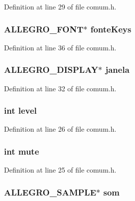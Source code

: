 Definition at line 29 of file comum.\-h.

\hypertarget{struct_game_a33606e6edba2c6b798d0c70df15eb89f}{
\subsubsection[{fonte\-Keys}]{\setlength{\rightskip}{0pt plus 5cm}A\-L\-L\-E\-G\-R\-O\-\_\-\-F\-O\-N\-T$\ast$ fonte\-Keys}}\label{struct_game_a33606e6edba2c6b798d0c70df15eb89f}


Definition at line 36 of file comum.\-h.

\hypertarget{struct_game_ab05780cb7c970d487cfa4eaeb3b583d2}{
\subsubsection[{janela}]{\setlength{\rightskip}{0pt plus 5cm}A\-L\-L\-E\-G\-R\-O\-\_\-\-D\-I\-S\-P\-L\-A\-Y$\ast$ janela}}\label{struct_game_ab05780cb7c970d487cfa4eaeb3b583d2}


Definition at line 32 of file comum.\-h.

\hypertarget{struct_game_acf4d33ee4cff36f69b924471174dcb11}{
\subsubsection[{level}]{\setlength{\rightskip}{0pt plus 5cm}int level}}\label{struct_game_acf4d33ee4cff36f69b924471174dcb11}


Definition at line 26 of file comum.\-h.

\hypertarget{struct_game_a29128ae5c15a12dea5fe4f263ba6cec1}{
\subsubsection[{mute}]{\setlength{\rightskip}{0pt plus 5cm}int mute}}\label{struct_game_a29128ae5c15a12dea5fe4f263ba6cec1}


Definition at line 25 of file comum.\-h.

\hypertarget{struct_game_a04a3905df1163c9f0f1572bb4bf44385}{
\subsubsection[{som}]{\setlength{\rightskip}{0pt plus 5cm}A\-L\-L\-E\-G\-R\-O\-\_\-\-S\-A\-M\-P\-L\-E$\ast$ som}}\label{struct_game_a04a3905df1163c9f0f1572bb4bf44385}


